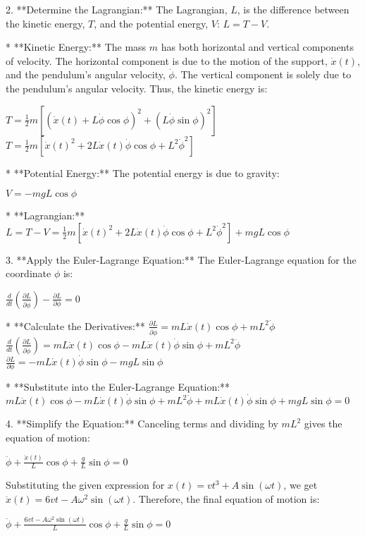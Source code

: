 \documentclass{article}
\begin{document}
2. **Determine the Lagrangian:**
   The Lagrangian, $L$, is the difference between the kinetic energy, $T$, and the potential energy, $V$: $L = T - V$.

   * **Kinetic Energy:**
     The mass $m$ has both horizontal and vertical components of velocity. The horizontal component is due to the motion of the support, $\dot{x}(t)$, and the pendulum's angular velocity, $\dot{\phi}$. The vertical component is solely due to the pendulum's angular velocity. Thus, the kinetic energy is:
     
     $T = \frac{1}{2}m [(\dot{x}(t) + L\dot{\phi} \cos \phi)^2 + (L\dot{\phi} \sin \phi)^2]$
     $T = \frac{1}{2}m [\dot{x}(t)^2 + 2L\dot{x}(t)\dot{\phi}\cos\phi + L^2\dot{\phi}^2]$

   * **Potential Energy:**
     The potential energy is due to gravity:
     
     $V = -mgL\cos\phi$

   * **Lagrangian:**
     $L = T - V = \frac{1}{2}m [\dot{x}(t)^2 + 2L\dot{x}(t)\dot{\phi}\cos\phi + L^2\dot{\phi}^2] + mgL\cos\phi$

3. **Apply the Euler-Lagrange Equation:**
   The Euler-Lagrange equation for the coordinate $\phi$ is:
   
   $\frac{d}{dt} \left( \frac{\partial L}{\partial \dot{\phi}} \right) - \frac{\partial L}{\partial \phi} = 0$

   * **Calculate the Derivatives:**
     $\frac{\partial L}{\partial \dot{\phi}} = mL\dot{x}(t)\cos\phi + mL^2\dot{\phi}$
     $\frac{d}{dt} \left( \frac{\partial L}{\partial \dot{\phi}} \right) = mL\ddot{x}(t)\cos\phi - mL\dot{x}(t)\dot{\phi}\sin\phi + mL^2\ddot{\phi}$
     $\frac{\partial L}{\partial \phi} = -mL\dot{x}(t)\dot{\phi}\sin\phi - mgL\sin\phi$

   * **Substitute into the Euler-Lagrange Equation:**
     $mL\ddot{x}(t)\cos\phi - mL\dot{x}(t)\dot{\phi}\sin\phi + mL^2\ddot{\phi} + mL\dot{x}(t)\dot{\phi}\sin\phi + mgL\sin\phi = 0$

4. **Simplify the Equation:**
   Canceling terms and dividing by $mL^2$ gives the equation of motion:
   
   $\ddot{\phi} + \frac{\ddot{x}(t)}{L}\cos\phi + \frac{g}{L}\sin\phi = 0$

   Substituting the given expression for $x(t) = vt^3 + A\sin(\omega t)$, we get $\ddot{x}(t) = 6vt - A\omega^2 \sin(\omega t)$.  Therefore, the final equation of motion is:

   $\ddot{\phi} + \frac{6vt - A\omega^2 \sin(\omega t)}{L}\cos\phi + \frac{g}{L}\sin\phi = 0$
\end{document}
